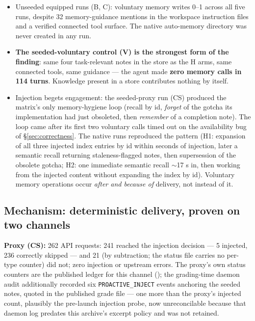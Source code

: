\documentclass[11pt]{article}
\begin{document}
\begin{itemize}
\item Unseeded equipped runs (B, C): voluntary memory writes 0--1 across all
  five runs, despite 32 memory-guidance mentions in the workspace
  instruction files and a verified connected tool surface. The native auto-memory
  directory was never created in any run.
\item \textbf{The seeded-voluntary control (V) is the strongest form of the
  finding}: same four task-relevant notes in the store as the H arms,
  same connected tools, same guidance --- the agent made \textbf{zero memory
  calls in 114 turns}. Knowledge present in a store contributes nothing
  by itself.
\item Injection begets engagement: the seeded-proxy run (CS) produced the
  matrix's only memory-hygiene loop (recall by id, \emph{forget} of the
  gotcha its implementation had just obsoleted, then \emph{remember} of a
  completion note). The loop came after its first two voluntary calls
  timed out on the availability bug of \S\ref{sec:correctness}. The native runs reproduced the pattern (H1: expansion
  of all three injected index entries by id within seconds of injection,
  later a semantic recall returning staleness-flagged notes, then
  supersession of the obsolete gotcha; H2: one immediate semantic
  recall $\sim$17 s in, then working from the injected content without
  expanding the index by id). Voluntary memory operations occur \emph{after
  and because of} delivery, not instead of it.
\end{itemize}

\subsection{Mechanism: deterministic delivery, proven on two channels}
\label{sec:mechanism}

\textbf{Proxy (CS):} 262 API requests: 241 reached the injection decision ---
5 injected, 236 correctly skipped --- and 21 (by subtraction; the
status file carries no per-type counter) did not; zero injection or
upstream errors. The proxy's own status counters are the published
ledger for this channel (); the grading-time
daemon audit additionally recorded six \texttt{PROACTIVE\_INJECT} events
anchoring the seeded notes, quoted in the published grade file --- one
more than the proxy's injected count, plausibly the pre-launch
injection probe, now unreconcilable because that daemon log predates
this archive's excerpt policy and was not retained.
\end{document}
